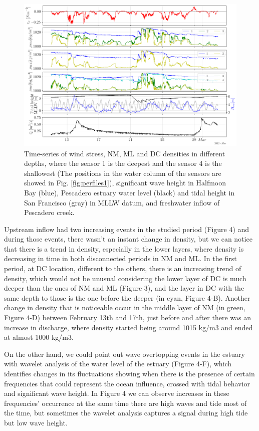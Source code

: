 \documentclass[11pt,letterpaper]{article}
\begin{document}
\begin{figure}[h!]
    \centering
    \includegraphics[width=\textwidth]{Imagenes/dens.png}
    \caption{Time-series of wind stress, NM, ML and DC densities in different depths, where the sensor 1 is the deepest and the sensor 4 is the shallowest (The positions in the water column of the sensors are showed in Fig. \ref{fig:perfiles1}), significant wave height in Halfmoon Bay (blue), Pescadero estuary water level (black) and tidal height in San Francisco (gray) in MLLW datum, and freshwater inflow of Pescadero creek.}
    \label{fig:dens}
\end{figure}


Upstream inflow had two increasing events in the studied period (Figure 4) and during those events, there wasn't an instant change in density, but we can notice that there is a trend in density, especially in the lower layers, where density is decreasing in time in both disconnected periods in NM and ML. In the first period, at DC location, different to the others, there is an increasing trend of density, which would not be unusual considering the lower layer of DC is much deeper than the ones of NM and ML (Figure 3), and the layer in DC with the same depth to those is the one before the deeper (in cyan, Figure 4-B). Another change in density that is noticeable occur in the middle layer of NM (in green, Figure 4-D) between February 13th and 17th, just before and after there was an increase in discharge, where density started being around 1015 kg/m3 and ended at almost 1000 kg/m3. 

On the other hand, we could point out wave overtopping events in the estuary with wavelet analysis of the water level of the estuary (Figure 4-F), which identifies changes in its fluctuations showing when there is the presence of certain frequencies that could represent the ocean influence, crossed with tidal behavior and significant wave height. In Figure 4 we can observe increases in these frequencies' occurrence at the same time there are high waves and tide most of the time, but sometimes the wavelet analysis captures a signal during high tide but low wave height.
\end{document}
